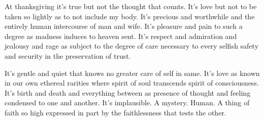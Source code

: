 

At thanksgiving it's true but not the thought that counts.  It's love
but not to be taken so lightly as to not include my body.  It's
precious and worthwhile and the entirely human intercourse of man and
wife.  It's pleasure and pain to such a degree as madness induces to
heaven sent.  It's respect and admiration and jealousy and rage as
subject to the degree of care necessary to every selfish safety and
security in the preservation of trust.

It's gentle and quiet that knows no greater care of self in same.
It's love as known in our own ethereal rarities where spirit of soul
transcends spirit of consciousness.  It's birth and death and
everything between as presence of thought and feeling condensed to one
and another.  It's implausible.  A mystery.  Human.  A thing of faith
so high expressed in part by the faithlessness that tests the other.

\bye
